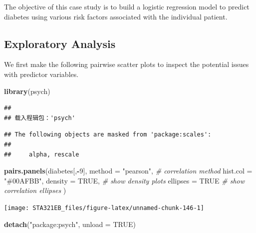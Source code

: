 \documentclass[
]{book}
\newenvironment{Shaded}{\begin{snugshade}}{\end{snugshade}}
\newcommand{\AttributeTok}[1]{\textcolor[rgb]{0.13,0.29,0.53}{#1}}
\newcommand{\CommentTok}[1]{\textcolor[rgb]{0.56,0.35,0.01}{\textit{#1}}}
\newcommand{\ConstantTok}[1]{\textcolor[rgb]{0.56,0.35,0.01}{#1}}
\newcommand{\DecValTok}[1]{\textcolor[rgb]{0.00,0.00,0.81}{#1}}
\newcommand{\FunctionTok}[1]{\textcolor[rgb]{0.13,0.29,0.53}{\textbf{#1}}}
\newcommand{\NormalTok}[1]{#1}
\newcommand{\SpecialCharTok}[1]{\textcolor[rgb]{0.81,0.36,0.00}{\textbf{#1}}}
\newcommand{\StringTok}[1]{\textcolor[rgb]{0.31,0.60,0.02}{#1}}
\begin{document}
The objective of this case study is to build a logistic regression model to predict diabetes using various risk factors associated with the individual patient.

\hypertarget{exploratory-analysis-1}{%
\subsection{Exploratory Analysis}\label{exploratory-analysis-1}}

We first make the following pairwise scatter plots to inspect the potential issues with predictor variables.

\begin{Shaded}
\begin{Highlighting}[]
\FunctionTok{library}\NormalTok{(psych)}
\end{Highlighting}
\end{Shaded}

\begin{verbatim}
## 
## 载入程辑包：'psych'
\end{verbatim}

\begin{verbatim}
## The following objects are masked from 'package:scales':
## 
##     alpha, rescale
\end{verbatim}

\begin{Shaded}
\begin{Highlighting}[]
\FunctionTok{pairs.panels}\NormalTok{(diabetes[,}\SpecialCharTok{{-}}\DecValTok{9}\NormalTok{], }
             \AttributeTok{method =} \StringTok{"pearson"}\NormalTok{, }\CommentTok{\# correlation method}
             \AttributeTok{hist.col =} \StringTok{"\#00AFBB"}\NormalTok{,}
             \AttributeTok{density =} \ConstantTok{TRUE}\NormalTok{,  }\CommentTok{\# show density plots}
             \AttributeTok{ellipses =} \ConstantTok{TRUE} \CommentTok{\# show correlation ellipses}
\NormalTok{             )}
\end{Highlighting}
\end{Shaded}

\begin{center}\texttt{[image: STA321EB\_files/figure-latex/unnamed-chunk-146-1]} \end{center}

\begin{Shaded}
\begin{Highlighting}[]
\FunctionTok{detach}\NormalTok{(}\StringTok{"package:psych"}\NormalTok{, }\AttributeTok{unload =} \ConstantTok{TRUE}\NormalTok{)}
\end{Highlighting}
\end{Shaded}
\end{document}
